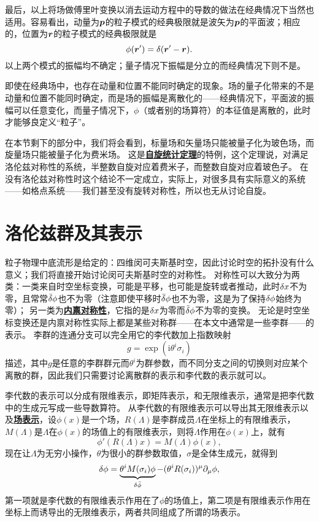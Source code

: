 \documentclass[hyperref, UTF8, a4paper]{ctexart}
\newcommand*{\ii}{\mathrm{i}}
\newcommand{\concept}[1]{\underline{\textbf{#1}}}
\begin{document}
最后，以上将场做傅里叶变换以消去运动方程中的导数的做法在经典情况下当然也适用。容易看出，动量为$\vb*{p}$的粒子模式的经典极限就是波矢为$\vb*{p}$的平面波；相应的，位置为$\vb*{r}$的粒子模式的经典极限就是
\[
    \phi(\vb*{r}') = \delta(\vb*{r}' - \vb*{r}).
\]
以上两个模式的振幅均不确定；量子情况下振幅是分立的而经典情况下则不是。

即使在经典场中，也存在动量和位置不能同时确定的现象。场的量子化带来的不是动量和位置不能同时确定，而是场的振幅是离散化的——经典情况下，平面波的振幅可以任意变化，而量子情况下，${\phi}$（或者别的场算符）的本征值是离散的，此时才能够良定义“粒子”。

在本节剩下的部分中，我们将会看到，标量场和矢量场只能被量子化为玻色场，而旋量场只能被量子化为费米场。
这是\concept{自旋统计定理}的特例，这个定理说，对满足洛伦兹对称性的系统，半整数自旋对应着费米子，而整数自旋对应着玻色子。
在没有洛伦兹对称性时这个结论不一定成立，实际上，对很多具有实际意义的系统——如格点系统——我们甚至没有旋转对称性，所以也无从讨论自旋。

\section{洛伦兹群及其表示}\label{sec:symmetry}

粒子物理中底流形是给定的：四维闵可夫斯基时空，因此讨论时空的拓扑没有什么意义；我们将直接开始讨论闵可夫斯基时空的对称性。
对称性可以大致分为两类：一类来自时空坐标变换，可能是平移，也可能是旋转或者推动，此时$\var{x}$不为零，且常常$\bar{\var}{\phi}$也不为零（注意即使平移时$\bar{\var}{\phi}$也不为零，这是为了保持$\var{\phi}$始终为零）；
另一类为\concept{内禀对称性}，它指的是$\var{x}$为零而$\bar{\var}{\phi}$不为零的变换。
无论是时空坐标变换还是内禀对称性实际上都是某些对称群——在本文中通常是一些李群——的表示。
李群的连通分支可以完全用它的李代数加上指数映射
\[
    g = \exp(\ii \theta^i \sigma_i)
\]
描述，其中$g$是任意的李群群元而$\theta^i$为群参数，而不同分支之间的切换则对应某个离散的群，因此我们只需要讨论离散群的表示和李代数的表示就可以。

李代数的表示可以分成有限维表示，即矩阵表示，和无限维表示，通常是把李代数中的生成元写成一些导数算符。
从李代数的有限维表示可以导出其无限维表示以及\concept{场表示}，设$\phi(x)$是一个场，$R(\Lambda)$是李群成员$\Lambda$在坐标上的有限维表示，$M(\Lambda)$是$\Lambda$在$\phi(x)$的场值上的有限维表示，则将$\Lambda$作用在$\phi(x)$上，就有
\[
    \phi'(R(\Lambda) x) = M(\Lambda) \phi(x),
\]
现在让$\Lambda$为无穷小操作，$\theta$为很小的群参数取值，$\sigma$是全体生成元，就得到
\begin{equation}
    \var{\phi} = \underbrace{\theta^i M(\sigma_i) \phi}_{\var{\bar{\phi}}} - (\theta^i R(\sigma_i))^\mu \partial_\mu \phi,
\end{equation}
第一项就是李代数的有限维表示作用在了$\phi$的场值上，第二项是有限维表示作用在坐标上而诱导出的无限维表示，两者共同组成了所谓的场表示。
\end{document}
